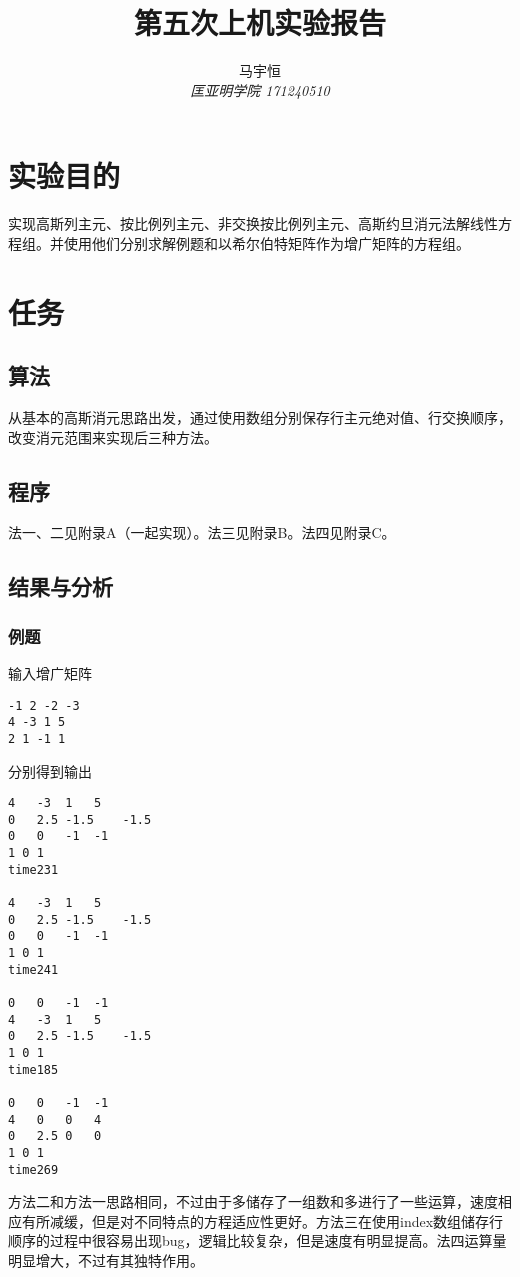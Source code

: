 \documentclass[a4paper,11pt,onecolumn,twoside]{article}
\title{\textbf{第五次上机实验报告}}
\author{
马宇恒
\\[2pt]
{\small \textit{匡亚明学院 171240510}}}
\date{}
\begin{document}
\maketitle
\thispagestyle{firststyle}
\setlength{\oddsidemargin}{ 1cm}
\setlength{\evensidemargin}{\oddsidemargin}
\setlength{\textwidth}{15.50cm}
\vspace{-.8cm}


\setcounter{page}{1}

\setlength{\oddsidemargin}{-.5cm}  %
\setlength{\evensidemargin}{\oddsidemargin}
\setlength{\textwidth}{17.00cm}

\section{实验目的}
实现高斯列主元、按比例列主元、非交换按比例列主元、高斯约旦消元法解线性方程组。并使用他们分别求解例题和以希尔伯特矩阵作为增广矩阵的方程组。

\section{任务}
\subsection{算法}
从基本的高斯消元思路出发，通过使用数组分别保存行主元绝对值、行交换顺序，改变消元范围来实现后三种方法。
\subsection{程序}
法一、二见附录A（一起实现）。法三见附录B。法四见附录C。
\subsection{结果与分析}
\subsubsection{例题}
输入增广矩阵
\begin{lstlisting}
-1 2 -2 -3
4 -3 1 5
2 1 -1 1
\end{lstlisting}
分别得到输出
\begin{lstlisting}
4	-3	1	5	
0	2.5	-1.5	-1.5	
0	0	-1	-1	
1 0 1 
time231

4	-3	1	5	
0	2.5	-1.5	-1.5	
0	0	-1	-1	
1 0 1 
time241

0	0	-1	-1	
4	-3	1	5	
0	2.5	-1.5	-1.5	
1 0 1 
time185

0	0	-1	-1	
4	0	0	4	
0	2.5	0	0	
1 0 1 
time269
\end{lstlisting}
方法二和方法一思路相同，不过由于多储存了一组数和多进行了一些运算，速度相应有所减缓，但是对不同特点的方程适应性更好。方法三在使用index数组储存行顺序的过程中很容易出现bug，逻辑比较复杂，但是速度有明显提高。法四运算量明显增大，不过有其独特作用。
\end{document}
